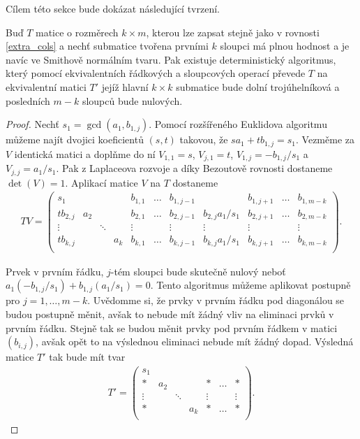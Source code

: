 Cílem této sekce bude dokázat následující tvrzení.
\begin{vet} \label{Zero_extra}
Buď $ T $ matice o rozměrech $ k \times m $, kterou lze zapsat stejně jako
v rovnosti \ref{extra_cols} a nechť submatice tvořena prvními $ k $ sloupci má
plnou hodnost a je navíc ve Smithově normálním tvaru.
Pak existuje deterministický algoritmus, který pomocí ekvivalentních řádkových
a sloupcových operací převede $ T $ na ekvivalentní matici $ T' $ jejíž
hlavní $ k \times k $ submatice bude dolní trojúhelníková a posledních $ m - k $
sloupců bude nulových.
\end{vet}
\begin{proof}
Nechť $ s_1 = \gcd(a_1, b_{1,j}) $. Pomocí rozšířeného Euklidova algoritmu
můžeme najít dvojici koeficientů $ (s,t) $ takovou, že
$ s a_1 + t b_{1,j} = s_1 $. Vezměme za $ V $ identická matici a doplňme do ní
$ V_{1,1} = s $, $ V_{j,1} = t $, $ V_{1,j} = -b_{1,j} / s_1 $ a
$ V_{j,j} = a_1 / s_1 $. Pak z Laplaceova rozvoje a díky Bezoutově rovnosti
dostaneme $ \det(V) = 1 $. Aplikací matice $ V $ na $ T $ dostaneme
\begin{align*}
TV =
    \left(
    \begin{array}{cccc|ccccccc}
        s_1      &     &        &     & b_{1,1} & \hdots & b_{1,j-1} &                   & b_{1,j+1} & \hdots & b_{1,m-k} \\
        tb_{2,j} & a_2 &        &     & b_{2,1} & \hdots & b_{2,j-1} & b_{2,j} a_1 / s_1 & b_{2,j+1} & \hdots & b_{2,m-k} \\
        \vdots   &     & \ddots &     & \vdots  &        & \vdots    & \vdots            & \vdots    &        & \vdots    \\
        tb_{k,j} &     &        & a_k & b_{k,1} & \hdots & b_{k,j-1} & b_{k,j} a_1 / s_1 & b_{k,j+1} & \hdots & b_{k,m-k} \\
    \end{array}
    \right).
\end{align*}

Prvek v prvním řádku, $ j $-tém sloupci bude skutečně nulový neboť
$ a_1 (-b_{1,j} / s_1) +  b_{1,j} (a_1 / s_1) = 0 $. Tento algoritmus můžeme
aplikovat postupně pro $ j = 1,\dots,m-k $. Uvědomme si, že prvky v prvním řádku
pod diagonálou se budou postupně měnit, avšak to nebude mít žádný vliv na
eliminaci prvků v prvním řádku. Stejně tak se budou měnit prvky pod prvním řádkem
v matici $ (b_{i,j}) $, avšak opět to na výslednou eliminaci nebude mít žádný
dopad. Výsledná matice $ T' $ tak bude mít tvar
\begin{align*}
T' =
    \left(
    \begin{array}{cccc|ccc}
        s_1    &     &        &     &         &        &           \\
        \ast   & a_2 &        &     & \ast    & \hdots & \ast      \\
        \vdots &     & \ddots &     & \vdots  &        & \vdots    \\
        \ast   &     &        & a_k & \ast    & \hdots & \ast      \\
    \end{array}
    \right).
\end{align*}


\end{proof}

